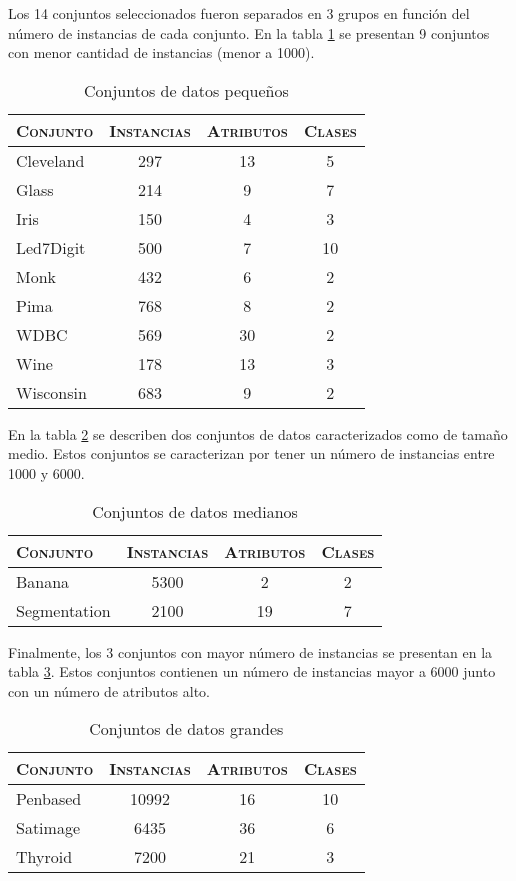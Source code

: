 Los 14 conjuntos seleccionados fueron separados en 3 grupos en función del número de instancias de cada conjunto. En la tabla \ref{data-small} se presentan 9 conjuntos con menor cantidad de instancias (menor a 1000).

\begin{table}[h!]
\centering
\begin{tabular}{l c c c}
\hline
\textsc{Conjunto} & \textsc{Instancias} & \textsc{Atributos} & \textsc{Clases} \\
\hline
\hline
Cleveland & 297 & 13 &  5 \\
Glass     & 214 &  9 &  7 \\
Iris      & 150 &  4 &  3 \\
Led7Digit & 500 &  7 & 10 \\
Monk      & 432 &  6 &  2 \\
Pima      & 768 &  8 &  2 \\
WDBC      & 569 & 30 &  2 \\
Wine      & 178 & 13 &  3 \\
Wisconsin & 683 &  9 &  2 \\
\hline
\end{tabular}
\caption{Conjuntos de datos pequeños}
\label{data-small}
\end{table}

En la tabla \ref{data-med} se describen dos conjuntos de datos caracterizados como de tamaño medio. Estos conjuntos se caracterizan por tener un número de instancias entre 1000 y 6000.

\begin{table}[h!]
\centering
\begin{tabular}{l c c c}
\hline
\textsc{Conjunto} & \textsc{Instancias} & \textsc{Atributos} & \textsc{Clases} \\
\hline
\hline
Banana       &  5300 &  2 &  2 \\
Segmentation &  2100 & 19 &  7 \\
\hline
\end{tabular}
\caption{Conjuntos de datos medianos}
\label{data-med}
\end{table}

Finalmente, los 3 conjuntos con mayor número de instancias se presentan en la tabla \ref{data-big}. Estos conjuntos contienen un número de instancias mayor a 6000 junto con un número de atributos alto.

\begin{table}[h!]
\centering
\begin{tabular}{l c c c}
\hline
\textsc{Conjunto} & \textsc{Instancias} & \textsc{Atributos} & \textsc{Clases} \\
\hline
\hline
Penbased    & 10992 & 16 & 10 \\
Satimage    &  6435 & 36 &  6 \\
Thyroid     &  7200 & 21 &  3 \\
\hline
\end{tabular}
\caption{Conjuntos de datos grandes}
\label{data-big}
\end{table}

